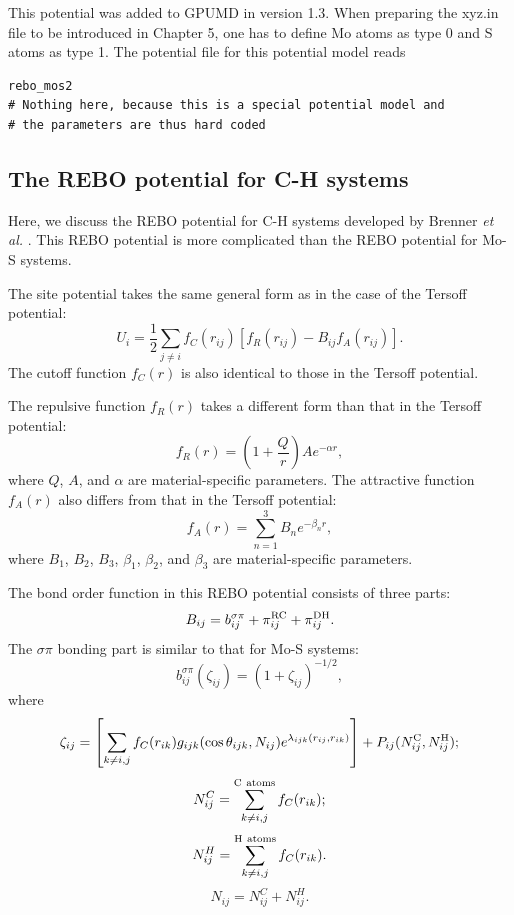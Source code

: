 \documentclass[12pt,a4paper]{report}
\begin{document}
This potential was added to GPUMD in version 1.3. When preparing the xyz.in file to be introduced in Chapter 5, one has to define Mo atoms as type 0 and S atoms as type 1. The potential file for this potential model reads
\begin{verbatim}
rebo_mos2
# Nothing here, because this is a special potential model and 
# the parameters are thus hard coded
\end{verbatim}


\subsection{The REBO potential for C-H systems}

Here, we discuss the REBO potential for C-H systems developed by Brenner \textit{et al.} \cite{brenner2002jpcm}. This REBO potential is more complicated than the REBO potential for Mo-S systems.

The site potential takes the same general form as in the case of the Tersoff potential:
\begin{equation}
U_i =  \frac{1}{2} \sum_{j \neq i} f_C(r_{ij}) \left[ f_R(r_{ij}) - B_{ij} f_A(r_{ij}) \right].
\end{equation}
The cutoff function $f_{C}(r)$ is also identical to those in the Tersoff potential. 

The repulsive function $f_{R}(r)$ takes a different form than that in the Tersoff potential:
\begin{equation}
f_{R}(r) = \left(1+\frac{Q}{r}\right) A e^{-\alpha r},
\end{equation}
where $Q$, $A$, and $\alpha$ are material-specific parameters. The attractive function $f_{A}(r)$ also differs from that in the Tersoff potential:
\begin{equation}
f_{A}(r) = \sum_{n=1}^3 B_n e^{-\beta_n r},
\end{equation}
where $B_1$, $B_2$, $B_3$, $\beta_1$, $\beta_2$, and $\beta_3$ are material-specific parameters.

The bond order function in this REBO potential consists of three parts:
\begin{equation}
B_{ij} =b_{ij}^{\sigma\pi} + \pi_{ij}^{\rm RC} + \pi_{ij}^{\rm DH}.
\end{equation}
The $\sigma\pi$ bonding part is similar to that for Mo-S systems:
\begin{equation}
b_{ij}^{\sigma\pi}(\zeta_{ij}) =\left(1 + \zeta_{ij}\right)^{-1/2},
\end{equation}
where
\begin{equation}
\zeta_{ij} = \left[ \sum_{k\neq i, j} f_C(r_{ik}) g_{ijk}(\cos\theta_{ijk}, N_{ij})e^{\lambda_{ijk}(r_{ij},r_{ik})} \right] + P_{ij}(N_{ij}^{\rm C}, N_{ij}^{\rm H});
\end{equation}
\begin{equation}
N_{ij}^{C} = \sum_{k\neq i,j}^{\rm{C~atoms}} f_C(r_{ik});
\end{equation}
\begin{equation}
N_{ij}^{H} = \sum_{k\neq i,j}^{\rm{H~atoms}} f_C(r_{ik}).
\end{equation}
\begin{equation}
N_{ij} =N_{ij}^{C}+N_{ij}^{H}.
\end{equation}
\end{document}

